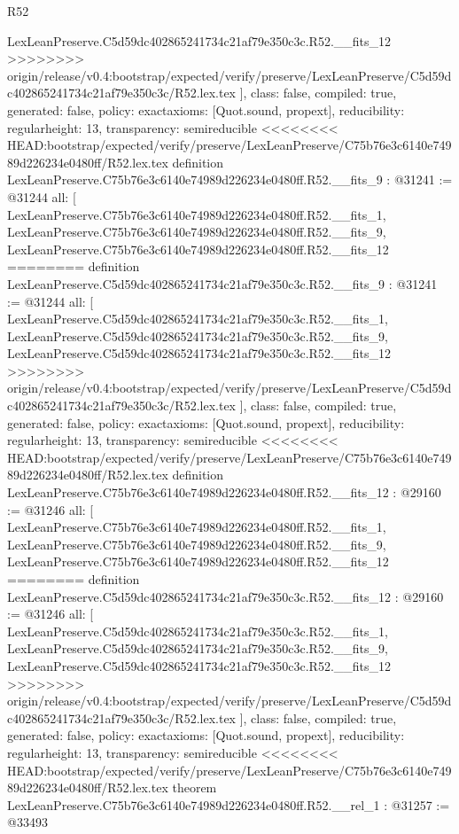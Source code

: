 \begin{lexlean}{R52}
\begin{coremodule}
{{{{{{{{{{{{{{{{{{{{{{{{{{{{{{{{{{{{{{{{{{{{{{{{{{{{{{{{{{{{{{{{{{{{{{{{{{{{{{{{{{{{{{{{{{{{{{{{{{{{{{{{{{{{{{{{{{{{{{{{{{{{{{{{{{{{{{{{{{{{{{{{{{{{{{    LexLeanPreserve.C5d59dc402865241734c21af79e350c3c.R52.__fits_12
>>>>>>>> origin/release/v0.4:bootstrap/expected/verify/preserve/LexLeanPreserve/C5d59dc402865241734c21af79e350c3c/R52.lex.tex
  ],
  class: false,
  compiled: true,
  generated: false,
  policy: exact{axioms: [Quot.sound, propext]},
  reducibility: regular{height: 13},
  transparency: semireducible
}
<<<<<<<< HEAD:bootstrap/expected/verify/preserve/LexLeanPreserve/C75b76e3c6140e74989d226234e0480ff/R52.lex.tex
definition LexLeanPreserve.C75b76e3c6140e74989d226234e0480ff.R52.__fits_9 : @31241 := @31244 {
  all: [
    LexLeanPreserve.C75b76e3c6140e74989d226234e0480ff.R52.__fits_1,
    LexLeanPreserve.C75b76e3c6140e74989d226234e0480ff.R52.__fits_9,
    LexLeanPreserve.C75b76e3c6140e74989d226234e0480ff.R52.__fits_12
========
definition LexLeanPreserve.C5d59dc402865241734c21af79e350c3c.R52.__fits_9 : @31241 := @31244 {
  all: [
    LexLeanPreserve.C5d59dc402865241734c21af79e350c3c.R52.__fits_1,
    LexLeanPreserve.C5d59dc402865241734c21af79e350c3c.R52.__fits_9,
    LexLeanPreserve.C5d59dc402865241734c21af79e350c3c.R52.__fits_12
>>>>>>>> origin/release/v0.4:bootstrap/expected/verify/preserve/LexLeanPreserve/C5d59dc402865241734c21af79e350c3c/R52.lex.tex
  ],
  class: false,
  compiled: true,
  generated: false,
  policy: exact{axioms: [Quot.sound, propext]},
  reducibility: regular{height: 13},
  transparency: semireducible
}
<<<<<<<< HEAD:bootstrap/expected/verify/preserve/LexLeanPreserve/C75b76e3c6140e74989d226234e0480ff/R52.lex.tex
definition LexLeanPreserve.C75b76e3c6140e74989d226234e0480ff.R52.__fits_12 : @29160 := @31246 {
  all: [
    LexLeanPreserve.C75b76e3c6140e74989d226234e0480ff.R52.__fits_1,
    LexLeanPreserve.C75b76e3c6140e74989d226234e0480ff.R52.__fits_9,
    LexLeanPreserve.C75b76e3c6140e74989d226234e0480ff.R52.__fits_12
========
definition LexLeanPreserve.C5d59dc402865241734c21af79e350c3c.R52.__fits_12 : @29160 := @31246 {
  all: [
    LexLeanPreserve.C5d59dc402865241734c21af79e350c3c.R52.__fits_1,
    LexLeanPreserve.C5d59dc402865241734c21af79e350c3c.R52.__fits_9,
    LexLeanPreserve.C5d59dc402865241734c21af79e350c3c.R52.__fits_12
>>>>>>>> origin/release/v0.4:bootstrap/expected/verify/preserve/LexLeanPreserve/C5d59dc402865241734c21af79e350c3c/R52.lex.tex
  ],
  class: false,
  compiled: true,
  generated: false,
  policy: exact{axioms: [Quot.sound, propext]},
  reducibility: regular{height: 13},
  transparency: semireducible
}
<<<<<<<< HEAD:bootstrap/expected/verify/preserve/LexLeanPreserve/C75b76e3c6140e74989d226234e0480ff/R52.lex.tex
theorem LexLeanPreserve.C75b76e3c6140e74989d226234e0480ff.R52.__rel_1 : @31257 := @33493 {
}}}}}}}}}}}}}}}}}}}}}}}}}}}}}}}}}}}}}}}}}}}}}}}}}}}}}}}}}}}}}}}}}}}}}}}}}}}}}}}}}}}}}}}}}}}}}}}}}}}}}}}}}}}}}}}}}}}}}}}}}}}}}}}}}}}}}}}}}}}}}}}}}}}}}}}}
\end{coremodule}
\end{lexlean}
